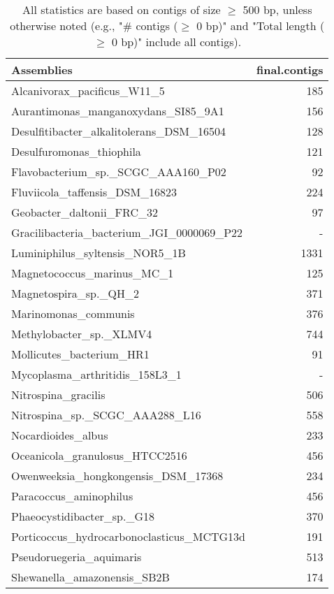 \documentclass[12pt,a4paper]{article}
\begin{document}
\begin{table}[ht]
\begin{center}
\caption{All statistics are based on contigs of size $\geq$ 500 bp, unless otherwise noted (e.g., "\# contigs ($\geq$ 0 bp)" and "Total length ($\geq$ 0 bp)" include all contigs).}
\begin{tabular}{|l*{1}{|r}|}
\hline
Assemblies & final.contigs \\ \hline
Alcanivorax\_pacificus\_W11\_5 & 185 \\ \hline
Aurantimonas\_manganoxydans\_SI85\_9A1 & 156 \\ \hline
Desulfitibacter\_alkalitolerans\_DSM\_16504 & 128 \\ \hline
Desulfuromonas\_thiophila & 121 \\ \hline
Flavobacterium\_sp.\_SCGC\_AAA160\_P02 & 92 \\ \hline
Fluviicola\_taffensis\_DSM\_16823 & 224 \\ \hline
Geobacter\_daltonii\_FRC\_32 & 97 \\ \hline
Gracilibacteria\_bacterium\_JGI\_0000069\_P22 & - \\ \hline
Luminiphilus\_syltensis\_NOR5\_1B & 1331 \\ \hline
Magnetococcus\_marinus\_MC\_1 & 125 \\ \hline
Magnetospira\_sp.\_QH\_2 & 371 \\ \hline
Marinomonas\_communis & 376 \\ \hline
Methylobacter\_sp.\_XLMV4 & 744 \\ \hline
Mollicutes\_bacterium\_HR1 & 91 \\ \hline
Mycoplasma\_arthritidis\_158L3\_1 & - \\ \hline
Nitrospina\_gracilis & 506 \\ \hline
Nitrospina\_sp.\_SCGC\_AAA288\_L16 & 558 \\ \hline
Nocardioides\_albus & 233 \\ \hline
Oceanicola\_granulosus\_HTCC2516 & 456 \\ \hline
Owenweeksia\_hongkongensis\_DSM\_17368 & 234 \\ \hline
Paracoccus\_aminophilus & 456 \\ \hline
Phaeocystidibacter\_sp.\_G18 & 370 \\ \hline
Porticoccus\_hydrocarbonoclasticus\_MCTG13d & 191 \\ \hline
Pseudoruegeria\_aquimaris & 513 \\ \hline
Shewanella\_amazonensis\_SB2B & 174 \\ \hline

\end{tabular}
\end{center}
\end{table}
\end{document}
